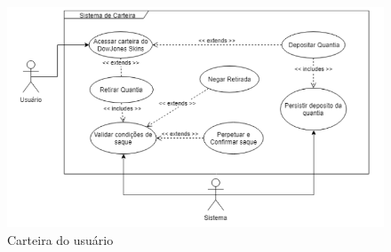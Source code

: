   \begin{figure}[!htb]
        \centering
        \includegraphics[scale=0.6]{Imagens/carteira.png}
        \caption{Carteira do usuário}
 \end{figure}